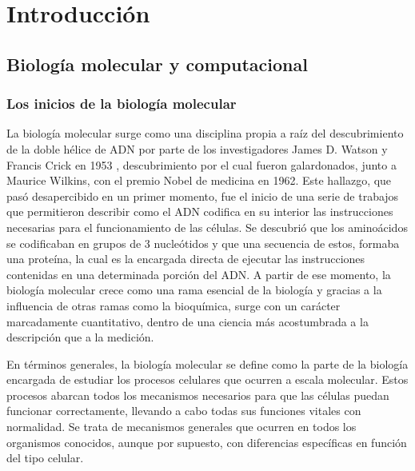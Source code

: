 
\chapter{Introducción}


\section{Biología molecular y computacional}


\subsection{Los inicios de la biología molecular}

La biología molecular surge como una disciplina propia a raíz del descubrimiento de la doble hélice de ADN por parte de los investigadores James D. Watson y Francis Crick en 1953 \cite{watsonycrick}, descubrimiento por el cual fueron galardonados, junto a Maurice Wilkins, con el premio Nobel de medicina en 1962. Este hallazgo, que pasó desapercibido en un primer momento, fue el inicio de una serie de trabajos que permitieron describir como el ADN codifica en su interior las instrucciones necesarias para el funcionamiento de las células. Se descubrió que los aminoácidos se codificaban en grupos de 3 nucleótidos y que una secuencia de estos, formaba una proteína, la cual es la encargada directa de ejecutar las instrucciones contenidas en una determinada porción del ADN. A partir de ese momento, la biología molecular crece como una rama esencial de la biología y gracias a la influencia de otras ramas como la bioquímica, surge con un carácter marcadamente cuantitativo, dentro de una ciencia más acostumbrada a la descripción que a la medición.

\medskip

En términos generales, la biología molecular se define como la parte de la biología encargada de estudiar los procesos celulares que ocurren a escala molecular. Estos procesos abarcan todos los mecanismos necesarios para que las células puedan funcionar correctamente, llevando a cabo todas sus funciones vitales con normalidad. Se trata de mecanismos generales que ocurren en todos los organismos conocidos, aunque por supuesto, con diferencias específicas en función del tipo celular.

\medskip

